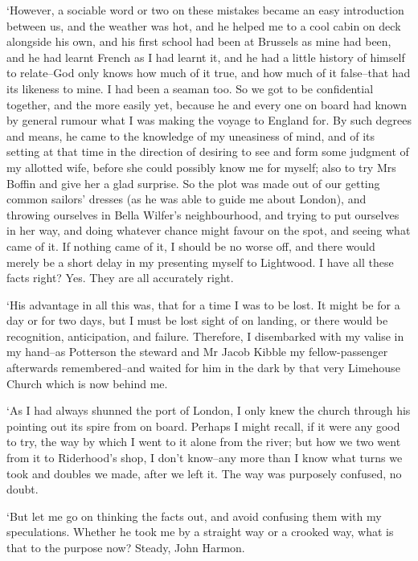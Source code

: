 ‘However, a sociable word or two on these mistakes became an easy
introduction between us, and the weather was hot, and he helped me to a
cool cabin on deck alongside his own, and his first school had been at
Brussels as mine had been, and he had learnt French as I had learnt it,
and he had a little history of himself to relate--God only knows how
much of it true, and how much of it false--that had its likeness to
mine. I had been a seaman too. So we got to be confidential together,
and the more easily yet, because he and every one on board had known
by general rumour what I was making the voyage to England for. By such
degrees and means, he came to the knowledge of my uneasiness of mind,
and of its setting at that time in the direction of desiring to see and
form some judgment of my allotted wife, before she could possibly know
me for myself; also to try Mrs Boffin and give her a glad surprise. So
the plot was made out of our getting common sailors’ dresses (as he was
able to guide me about London), and throwing ourselves in Bella Wilfer’s
neighbourhood, and trying to put ourselves in her way, and doing
whatever chance might favour on the spot, and seeing what came of it. If
nothing came of it, I should be no worse off, and there would merely
be a short delay in my presenting myself to Lightwood. I have all these
facts right? Yes. They are all accurately right.

‘His advantage in all this was, that for a time I was to be lost. It
might be for a day or for two days, but I must be lost sight of on
landing, or there would be recognition, anticipation, and failure.
Therefore, I disembarked with my valise in my hand--as Potterson
the steward and Mr Jacob Kibble my fellow-passenger afterwards
remembered--and waited for him in the dark by that very Limehouse Church
which is now behind me.

‘As I had always shunned the port of London, I only knew the church
through his pointing out its spire from on board. Perhaps I might
recall, if it were any good to try, the way by which I went to it alone
from the river; but how we two went from it to Riderhood’s shop, I don’t
know--any more than I know what turns we took and doubles we made, after
we left it. The way was purposely confused, no doubt.

‘But let me go on thinking the facts out, and avoid confusing them with
my speculations. Whether he took me by a straight way or a crooked way,
what is that to the purpose now? Steady, John Harmon.

